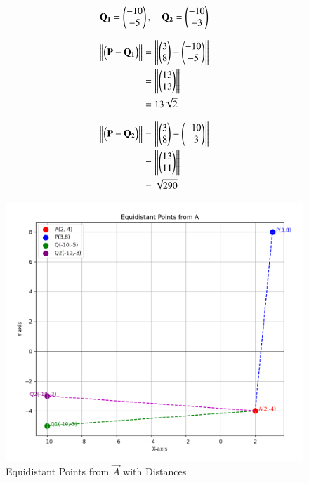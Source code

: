 \documentclass[journal]{IEEEtran}
\begin{document}
\begin{align}
   \mathbf{Q_1} = \begin{pmatrix}-10 \\ -5\end{pmatrix}, \quad
   \mathbf{Q_2} = \begin{pmatrix}-10 \\ -3\end{pmatrix}
\end{align}

\begin{align}
    \left\lVert\begin{pmatrix}\mathbf{P} - \mathbf{Q_1}\end{pmatrix}\right\rVert &= \left\|\begin{pmatrix}3\\8\end{pmatrix} - \begin{pmatrix}-10\\-5\end{pmatrix}\right\| \\
    &= \left\|\begin{pmatrix}13\\13\end{pmatrix}\right\| \\
    &= 13\sqrt{2}
\end{align}

\begin{align}
    \left\lVert\begin{pmatrix}\mathbf{P} - \mathbf{Q_2}\end{pmatrix}\right\rVert &= \left\|\begin{pmatrix}3\\8\end{pmatrix} - \begin{pmatrix}-10\\-3\end{pmatrix}\right\| \\
    &= \left\|\begin{pmatrix}13\\11\end{pmatrix}\right\| \\
    &= \sqrt{290}
\end{align}

\begin{figure}[H]
\centering
\includegraphics[width=0.56\columnwidth]{figs/fig1.png}
 \caption*{Equidistant Points from $\vec{A}$ with Distances}
\label{fig:graph.png}
\end{figure}
\end{document}
